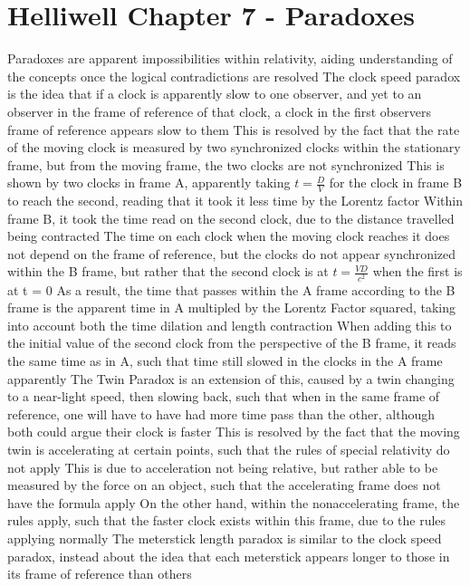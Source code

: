 \documentclass[11 pt, twoside]{article}
\newenvironment{outline*}
{
	\begin{outline}[enumerate]
	}
	{\end{outline}
}
\begin{document}
\section{Helliwell Chapter 7 - Paradoxes}
\begin{outline*}
\1 Paradoxes are apparent impossibilities within relativity, aiding understanding of the concepts once the logical contradictions are resolved
\1 The clock speed paradox is the idea that if a clock is apparently slow to one observer, and yet to an observer in the frame of reference of that clock, a clock in the first observers frame of reference appears slow to them
\2 This is resolved by the fact that the rate of the moving clock is measured by two synchronized clocks within the stationary frame, but from the moving frame, the two clocks are not synchronized
\2 This is shown by two clocks in frame A, apparently taking $t = \frac{D}{V}$ for the clock in frame B to reach the second, reading that it took it less time by the Lorentz factor
\3 Within frame B, it took the time read on the second clock, due to the distance travelled being contracted
\3 The time on each clock when the moving clock reaches it does not depend on the frame of reference, but the clocks do not appear synchronized within the B frame, but rather that the second clock is at $t = \frac{VD}{c^2}$ when the first is at t = 0
\3 As a result, the time that passes within the A frame according to the B frame is the apparent time in A multipled by the Lorentz Factor squared, taking into account both the time dilation and length contraction
\4 When adding this to the initial value of the second clock from the perspective of the B frame, it reads the same time as in A, such that time still slowed in the clocks in the A frame apparently
\2 The Twin Paradox is an extension of this, caused by a twin changing to a near-light speed, then slowing back, such that when in the same frame of reference, one will have to have had more time pass than the other, although both could argue their clock is faster
\3 This is resolved by the fact that the moving twin is accelerating at certain points, such that the rules of special relativity do not apply
\4 This is due to acceleration not being relative, but rather able to be measured by the force on an object, such that the accelerating frame does not have the formula apply
\3 On the other hand, within the nonaccelerating frame, the rules apply, such that the faster clock exists within this frame, due to the rules applying normally
\1 The meterstick length paradox is similar to the clock speed paradox, instead about the idea that each meterstick appears longer to those in its frame of reference than others

\end{outline*}
\end{document}
